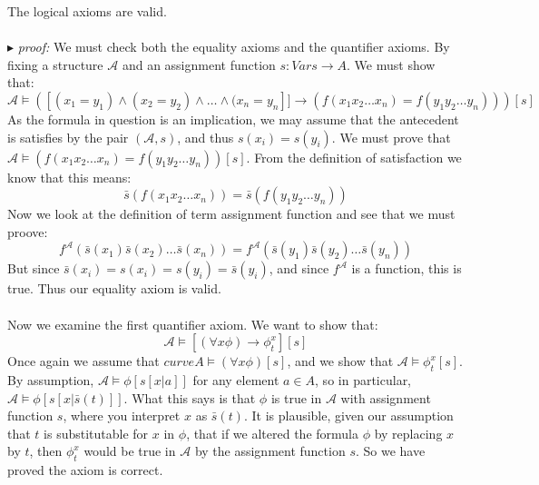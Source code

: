 \documentclass[9pt,a4paper]{article}
\newcounter{theo}
\newcommand{\curveA}{\mathcal{A}}
\newcommand{\proof}{\ \\ \ \\ $\blacktriangleright$ \textit{proof: }}
\begin{document}
        \begin{theorem}
            The logical axioms are valid.
            \proof We must check both the equality axioms and the quantifier axioms. By fixing a structure $\curveA$ and an assignment function $s:Vars \rightarrow A$. We must show that:
            \begin{equation}
                \curveA \vDash\left(
                    [(x_1=y_1)\land (x_2=y_2)\land \dots\land (x_n=y_n]]\rightarrow (f(x_1x_2\dots x_n) = f(y_1y_2\dots y_n))
                \right)[s]
            \end{equation}
            As the formula in question is an implication, we may assume that the antecedent is satisfies by the pair $(\curveA, s)$, and thus $s(x_i) = s(y_i)$. We must prove that $\curveA\vDash(f(x_1x_2\dots x_n) = f(y_1y_2\dots y_n))[s]$. From the definition of satisfaction we know that this means:
            \begin{equation}
               \bar s(f(x_1x_2\dots x_n)) = \bar s(f(y_1y_2\dots y_n))
            \end{equation}
            Now we look at the definition of term assignment function and see that we must proove:
            \begin{equation}
                f^\curveA(\bar s(x_1)\bar s(x_2)\dots \bar s(x_n))=f^\curveA(\bar s(y_1)\bar s(y_2)\dots \bar s(y_n))
            \end{equation}
            But since $\bar s(x_i) = s(x_i) = s(y_i) = \bar s(y_i)$, and since $f^\curveA$ is a function, this is true. Thus our equality axiom is valid.
            \\
            \\ 
            Now we examine the first quantifier axiom. We want to show that:
            \begin{equation}
                \curveA \vDash [(\forall x\phi)\rightarrow \phi_t^x][s]
            \end{equation}
            Once again we assume that $curveA\vDash(\forall x\phi)[s]$, and we show that $\curveA\vDash \phi_t^x[s]$. By assumption, $\curveA\vDash\phi[s[x|a]]$ for any element $a\in A$, so in particular, $\curveA\vDash\phi[s[x|\bar s(t)]]$. What this says is that $\phi$ is true in $\curveA$ with assignment function $s$, where you interpret $x$ as $\bar s(t)$. It is plausible, given our assumption that $t$ is substitutable for $x$ in $\phi$, that if we altered the formula $\phi$ by replacing $x$ by $t$, then $\phi_t^x$ would be true in $\curveA$ by the assignment function $s$. So we have proved the axiom is correct.
        \end{theorem}
            
\end{document}
